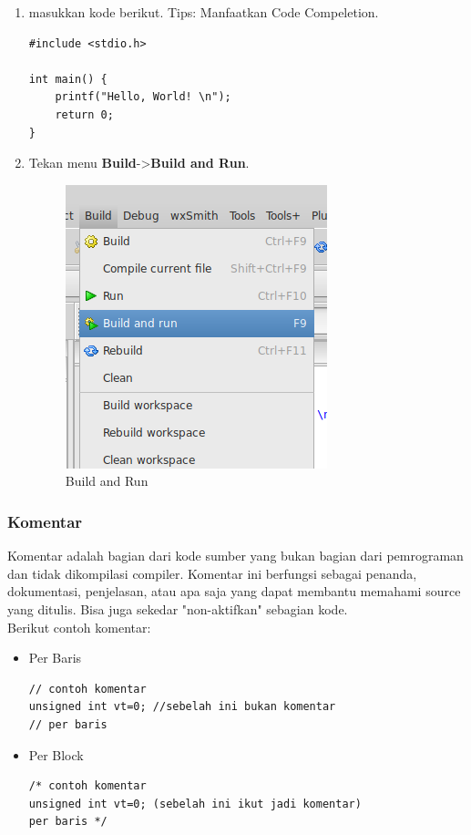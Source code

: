 \documentclass[12pt,]{article}
\begin{document}
\begin{enumerate}
		\item masukkan kode berikut.
		Tips: Manfaatkan Code Compeletion.
		\begin{verbatim}
#include <stdio.h>

int main() {
	printf("Hello, World! \n");
	return 0;
}
		\end{verbatim}
		\item Tekan menu \textbf{Build}->\textbf{Build and Run}.
		\begin{figure}[H]
			\centering
			\includegraphics[width=0.4\linewidth]{images/c_cb_10}
			\caption{Build and Run}
		\end{figure}
			
	\end{enumerate}

	\subsubsection{Komentar}
	Komentar adalah bagian dari kode sumber yang bukan bagian dari pemrograman dan tidak dikompilasi compiler.
	Komentar ini berfungsi sebagai penanda, dokumentasi, penjelasan, atau apa saja yang dapat membantu memahami source yang ditulis.
	Bisa juga sekedar "non-aktifkan" sebagian kode.\\
	Berikut contoh komentar:
	\begin{itemize}
		\item Per Baris
		\begin{verbatim}
// contoh komentar
unsigned int vt=0; //sebelah ini bukan komentar
// per baris
		\end{verbatim}
		
		\item Per Block
		\begin{verbatim}
/* contoh komentar
unsigned int vt=0; (sebelah ini ikut jadi komentar)
per baris */
		\end{verbatim}
	\end{itemize}
\end{document}
